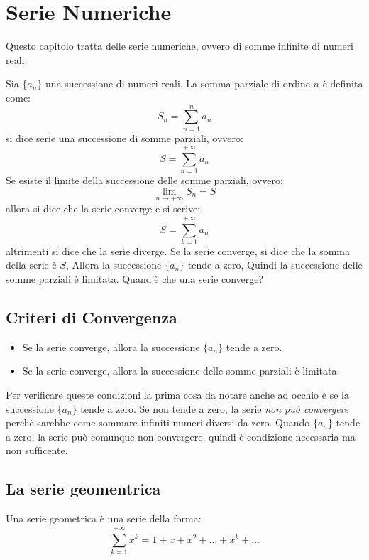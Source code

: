 \section{Serie Numeriche}
    Questo capitolo tratta delle serie numeriche, ovvero di somme infinite di numeri reali.
    
    
    \begin{definizione}
        
    Sia $\{a_n\}$ una successione di numeri reali. La somma parziale di ordine $n$ è definita come:
    \[
    S_n = \sum_{n=1}^n a_n
    \] si dice serie una successione di somme parziali, ovvero:
    \[ S = \sum_{n=1}^{+\infty} a_n \]
    Se esiste il limite della successione delle somme parziali, ovvero: \[ \lim_{n \to +\infty} S_n = S \] allora si dice che la serie converge e si scrive: \[ S = \sum_{k=1}^{+\infty} a_n \] altrimenti si dice che la serie diverge.
    Se la serie converge, si dice che la somma della serie è $S$, 
    Allora la successione $\{a_n\}$ tende a zero,
    Quindi la successione delle somme parziali è limitata.
    Quand'è che una serie converge?
    \end{definizione}
    \subsection{Criteri di Convergenza}
    \begin{itemize}
        \item Se la serie converge, allora la successione $\{a_n\}$ tende a zero.
        \item Se la serie converge, allora la successione delle somme parziali è limitata.
    \end{itemize}
    Per verificare queste condizioni la prima cosa da notare anche ad occhio è se la successione $\{a_n\}$ tende a zero. Se non tende a zero, la serie \emph{non può convergere} perchè sarebbe come sommare infiniti numeri diversi da zero.
    Quando $\{a_n\}$ tende a zero, la serie può comunque non convergere, quindi è condizione necessaria ma non sufficente.

\subsection{La serie geomentrica}
\begin{definizione}
    Una serie geometrica è una serie della forma:
    \begin{equation}
     \sum_{k=1}^{+\infty} x^k = 1 + x + x^2 + \ldots + x^{k} + \ldots 
    \end{equation}
\end{definizione}


